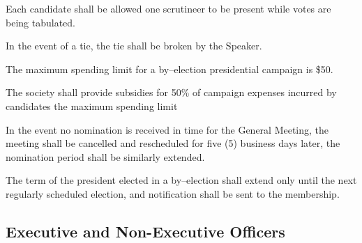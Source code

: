 \begin{longenum}[ label*=\thesubsection.\arabic*., align=left]
	\item Each candidate shall be allowed one scrutineer to be present while votes are being tabulated.
	\item In the event of a tie, the tie shall be broken by the Speaker.
	\item The maximum spending limit for a by--election presidential campaign is \$50.
	\item The society shall provide subsidies for 50\% of campaign expenses incurred by candidates the maximum spending limit
	\item In the event no nomination is received in time for the General Meeting, the meeting shall be cancelled and rescheduled for five (5) business days later, the nomination period shall be similarly extended.
	\item The term of the president elected in a by--election shall extend only until the next regularly scheduled election, and notification shall be sent to the membership.
\end{longenum}

\subsection{Executive and Non-Executive Officers}

